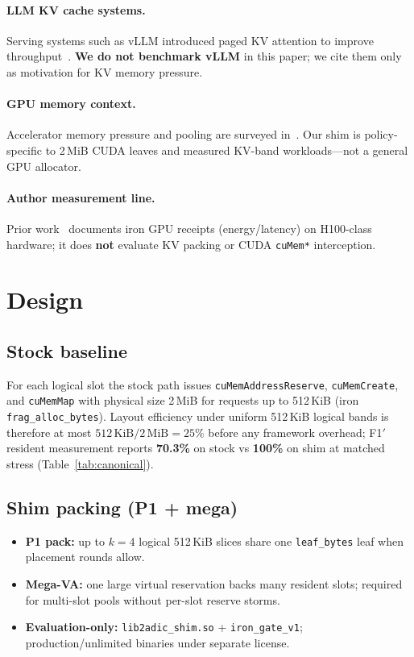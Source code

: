 \documentclass[11pt]{article}
\begin{document}
\paragraph{LLM KV cache systems.}
Serving systems such as vLLM introduced paged KV attention to improve throughput~\cite{vllm}.
\textbf{We do not benchmark vLLM} in this paper; we cite them only as motivation for KV memory pressure.

\paragraph{GPU memory context.}
Accelerator memory pressure and pooling are surveyed in~\cite{sze2017efficient}.
Our shim is policy-specific to 2\,MiB CUDA leaves and measured KV-band workloads---not a general GPU allocator.

\paragraph{Author measurement line.}
Prior work~\cite{byriukov2026tal} documents iron GPU receipts (energy/latency) on H100-class hardware; it does \textbf{not} evaluate KV packing or CUDA \texttt{cuMem*} interception.

\section{Design}
\label{sec:design}

\subsection{Stock baseline}
For each logical slot the stock path issues \texttt{cuMemAddressReserve}, \texttt{cuMemCreate}, and \texttt{cuMemMap} with physical size 2\,MiB for requests up to 512\,KiB (iron \texttt{frag\_alloc\_bytes}).
Layout efficiency under uniform 512\,KiB logical bands is therefore at most $512\,\mathrm{KiB}/2\,\mathrm{MiB}=25\%$ before any framework overhead; F1$'$ resident measurement reports \textbf{70.3\%} on stock vs \textbf{100\%} on shim at matched stress (Table~\ref{tab:canonical}).

\subsection{Shim packing (P1 + mega)}
\begin{itemize}
  \item \textbf{P1 pack:} up to $k{=}4$ logical 512\,KiB slices share one \texttt{leaf\_bytes} leaf when placement rounds allow.
  \item \textbf{Mega-VA:} one large virtual reservation backs many resident slots; required for multi-slot pools without per-slot reserve storms.
  \item \textbf{Evaluation-only:} \texttt{lib2adic\_shim.so} + \texttt{iron\_gate\_v1}; production/unlimited binaries under separate license.
\end{itemize}
\end{document}
